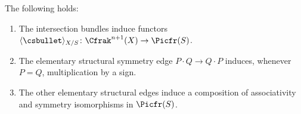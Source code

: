 \begin{lemma}\label{lemma:Elkik-functor-free-category}
The following holds:
\begin{enumerate}
\item\label{item:Elkik-functor-free-category-1} The intersection bundles induce functors $\langle\csbullet\rangle_{X/S}\colon\Cfrak^{n+1}(X) \to \Picfr(S)$.
\item\label{item:Elkik-functor-free-category-2} The elementary structural symmetry edge $P \cdot Q \to Q \cdot P$ induces, whenever $P =Q$, multiplication by a sign.
\item\label{item:Elkik-functor-free-category-3} The other elementary structural edges induce a composition of associativity and symmetry isomorphisms in $\Picfr(S)$.
\end{enumerate}
\end{lemma}
